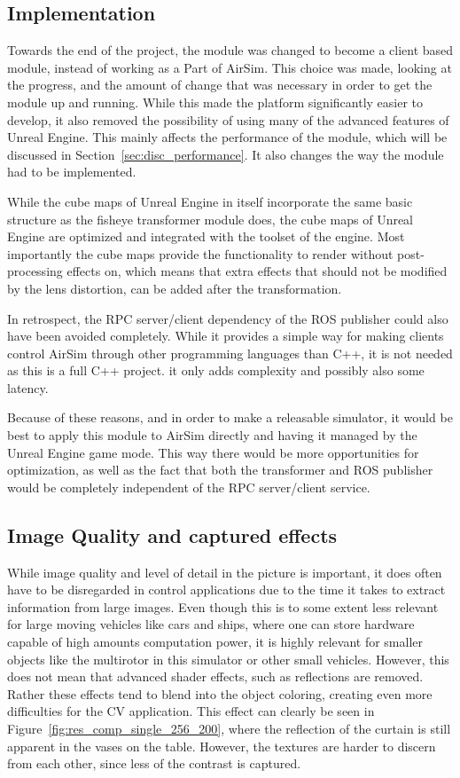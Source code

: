 \subsection{Implementation}

Towards the end of the project, the module was changed to become a client based module, instead of working as a Part of AirSim. This choice was made, looking at the progress, and the amount of change that was necessary in order to get the module up and running. While this made the platform significantly easier to develop, it also removed the possibility of using many of the advanced features of Unreal Engine. This mainly affects the performance of the module, which will be discussed in Section~\ref{sec:disc_performance}. It also changes the way the module had to be implemented.

While the cube maps of Unreal Engine in itself incorporate the same basic structure as the fisheye transformer module does, the cube maps of Unreal Engine are optimized and integrated with the toolset of the engine. Most importantly the cube maps provide the functionality to render without post-processing effects on, which means that extra effects that should not be modified by the lens distortion, can be added after the transformation.

In retrospect, the RPC server/client dependency of the ROS publisher could also have been avoided completely. While it provides a simple way for making clients control AirSim through other programming languages than C++, it is not needed as this is a full C++ project. it only adds complexity and possibly also some latency.

Because of these reasons, and in order to make a releasable simulator, it would be best to apply this module to AirSim directly and having it managed by the Unreal Engine game mode. This way there would be more opportunities for optimization, as well as the fact that both the transformer and ROS publisher would be completely independent of the RPC server/client service.

\subsection{Image Quality and captured effects}

While image quality and level of detail in the picture is important, it does often have to be disregarded in control applications due to the time it takes to extract information from large images. Even though this is to some extent less relevant for large moving vehicles like cars and ships, where one can store hardware capable of high amounts computation power, it is highly relevant for smaller objects like the multirotor in this simulator or other small vehicles. However, this does not mean that advanced shader effects, such as reflections are removed. Rather these effects tend to blend into the object coloring, creating even more difficulties for the CV application. This effect can clearly be seen in Figure~\ref{fig:res_comp_single_256_200}, where the reflection of the curtain is still apparent in the vases on the table. However, the textures are harder to discern from each other, since less of the contrast is captured.

